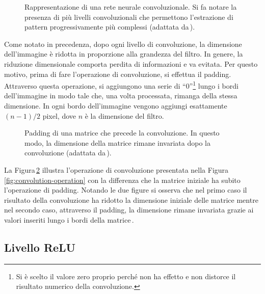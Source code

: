 % 
\begin{figure}[!t]
    \centering
    
    \caption[Rappresentazione di una rete neurale convoluzionale.]{Rappresentazione di una rete neurale convoluzionale. Si fa notare la presenza di più livelli convoluzionali che permettono l'estrazione di pattern progressivamente più complessi (adattata da\,\cite{izaak2022neural}).}\label{fig:convolutional-neural-network}
\end{figure}

Come notato in precedenza, dopo ogni livello di convoluzione, la dimensione dell'immagine è ridotta in proporzione alla grandezza del filtro. In genere, la riduzione dimensionale comporta perdita di informazioni e va evitata. Per questo motivo, prima di fare l'operazione di convoluzione, si effettua il padding. Attraverso questa operazione, si aggiungono una serie di ``0''\footnote{Si è scelto il valore zero proprio perché non ha effetto e non distorce il risultato numerico della convoluzione.} lungo i bordi dell'immagine in modo tale che, una volta processata, rimanga della stessa dimensione. In ogni bordo dell'immagine vengono aggiungi esattamente $(n - 1) / 2$ pixel, dove $n$ è la dimensione del filtro. 
% 
\begin{figure}[!t]
    \centering
    
    \caption[Padding di una matrice che precede la convoluzione.]{Padding di una matrice che precede la convoluzione. In questo modo, la dimensione della matrice rimane invariata dopo la convoluzione (adattata da\,\cite{janosh_convolution}).}\label{fig:padding}
\end{figure}
% 
La Figura\,\ref{fig:padding} illustra l'operazione di convoluzione presentata nella Figura\,\ref{fig:convolution-operation} con la differenza che la matrice iniziale ha subito l'operazione di padding. Notando le due figure si osserva che nel primo caso il risultato della convoluzione ha ridotto la dimensione iniziale delle matrice mentre nel secondo caso, attraverso il padding, la dimensione rimane invariata grazie ai valori inseriti lungo i bordi della matrice\,\cite{aggarwal2018neural}.

\subsection{Livello \acs{ReLU}}

